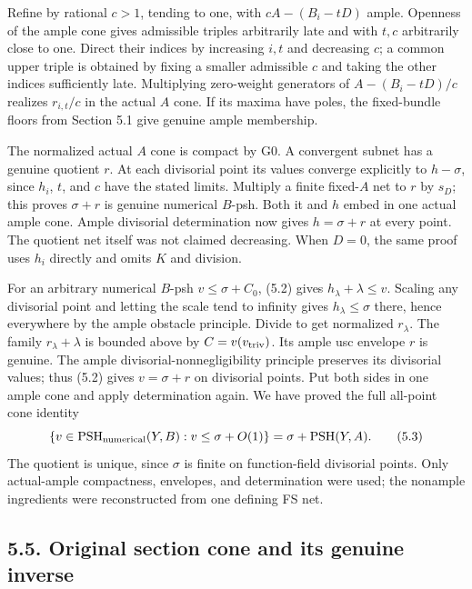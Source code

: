 \documentclass[
  10pt,
]{article}
\begin{document}
Refine by rational \(c>1\), tending to one, with \(cA-(B_i-tD)\) ample.
Openness of the ample cone gives admissible triples arbitrarily late and
with \(t,c\) arbitrarily close to one. Direct their indices by
increasing \(i,t\) and decreasing \(c\); a common upper triple is
obtained by fixing a smaller admissible \(c\) and taking the other
indices sufficiently late. Multiplying zero-weight generators of
\(A-(B_i-tD)/c\) realizes \(r_{i,t}/c\) in the actual \(A\) cone. If its
maxima have poles, the fixed-bundle floors from Section 5.1 give genuine
ample membership.

The normalized actual \(A\) cone is compact by G0. A convergent subnet
has a genuine quotient \(r\). At each divisorial point its values
converge explicitly to \(h-\sigma\), since \(h_i\), \(t\), and \(c\)
have the stated limits. Multiply a finite fixed-\(A\) net to \(r\) by
\(s_D\); this proves \(\sigma+r\) is genuine numerical \(B\)-psh. Both
it and \(h\) embed in one actual ample cone. Ample divisorial
determination now gives \(h=\sigma+r\) at every point. The quotient net
itself was not claimed decreasing. When \(D=0\), the same proof uses
\(h_i\) directly and omits \(K\) and division.

For an arbitrary numerical \(B\)-psh \(v\leq\sigma+C_0\), (5.2) gives
\(h_\lambda+\lambda\leq v\). Scaling any divisorial point and letting
the scale tend to infinity gives \(h_\lambda\leq\sigma\) there, hence
everywhere by the ample obstacle principle. Divide to get normalized
\(r_\lambda\). The family \(r_\lambda+\lambda\) is bounded above by
\(C=v(v_{\rm triv})\). Its ample usc envelope \(r\) is genuine. The
ample divisorial-nonnegligibility principle preserves its divisorial
values; thus (5.2) gives \(v=\sigma+r\) on divisorial points. Put both
sides in one ample cone and apply determination again. We have proved
the full all-point cone identity
\[\{v\in\operatorname{PSH}_{\rm numerical}(Y,B):v\leq\sigma+O(1)\}
=\sigma+\operatorname{PSH}(Y,A).                         \tag{5.3}\] The
quotient is unique, since \(\sigma\) is finite on function-field
divisorial points. Only actual-ample compactness, envelopes, and
determination were used; the nonample ingredients were reconstructed
from one defining FS net.

\subsection{5.5. Original section cone and its genuine
inverse}\label{original-section-cone-and-its-genuine-inverse}
\end{document}
